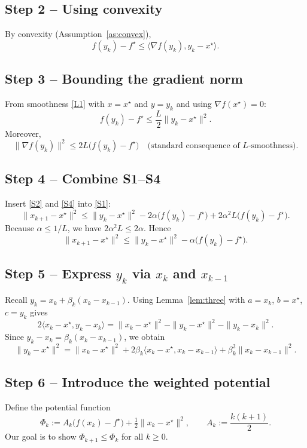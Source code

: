 \documentclass{article}
\begin{document}
\subsection*{Step 2 – Using convexity}
By convexity (Assumption~\ref{as:convex}),
\[
f(y_k)-f^\star\le \langle\nabla f(y_k),y_k-x^\star\rangle .
\tag{S2}
\]

\subsection*{Step 3 – Bounding the gradient norm}
From smoothness \eqref{L1} with \(x=x^\star\) and \(y=y_k\) and using \(\nabla f(x^\star)=0\):
\[
f(y_k)-f^\star\le \frac{L}{2}\|y_k-x^\star\|^{2}.
\tag{S3}
\]
Moreover,
\[
\|\nabla f(y_k)\|^{2}\le 2L\bigl(f(y_k)-f^\star\bigr) \quad\text{(standard consequence of \(L\)-smoothness)}.
\tag{S4}
\]

\subsection*{Step 4 – Combine S1–S4}
Insert \eqref{S2} and \eqref{S4} into \eqref{S1}:
\[
\|x_{k+1}-x^\star\|^{2}
\le \|y_k-x^\star\|^{2}
-2\alpha\bigl(f(y_k)-f^\star\bigr)
+2\alpha^{2}L\bigl(f(y_k)-f^\star\bigr).
\tag{S5}
\]
Because \(\alpha\le 1/L\), we have \(2\alpha^{2}L\le 2\alpha\). Hence
\[
\|x_{k+1}-x^\star\|^{2}
\le \|y_k-x^\star\|^{2}
- \alpha\bigl(f(y_k)-f^\star\bigr).
\tag{S6}
\]

\subsection*{Step 5 – Express \(y_k\) via \(x_k\) and \(x_{k-1}\)}
Recall \(y_k = x_k+\beta_k(x_k-x_{k-1})\). Using Lemma~\ref{lem:three} with
\(a=x_k\), \(b=x^\star\), \(c=y_k\) gives
\[
2\langle x_k-x^\star, y_k-x_k\rangle
 =\|x_k-x^\star\|^{2}-\|y_k-x^\star\|^{2}-\|y_k-x_k\|^{2}.
\tag{S7}
\]
Since \(y_k-x_k = \beta_k (x_k-x_{k-1})\), we obtain
\[
\|y_k-x^\star\|^{2}
 =\|x_k-x^\star\|^{2}
 +2\beta_k\langle x_k-x^\star, x_k-x_{k-1}\rangle
 +\beta_k^{2}\|x_k-x_{k-1}\|^{2}.
\tag{S8}
\]

\subsection*{Step 6 – Introduce the weighted potential}
Define the potential function
\[
\Phi_k := A_k\bigl(f(x_k)-f^\star\bigr)+\tfrac12\|x_k-x^\star\|^{2},
\qquad A_k:=\frac{k(k+1)}{2}.
\tag{S9}
\]
Our goal is to show \(\Phi_{k+1}\le\Phi_k\) for all \(k\ge 0\).
\end{document}
